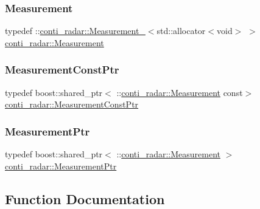 \mbox{\label{namespaceconti__radar_a89a4c51c8eaeb98be9a074f53e585df1}} 
\subsubsection{\texorpdfstring{Measurement}{Measurement}}
{\footnotesize\ttfamily typedef \+::\hyperlink{structconti__radar_1_1Measurement__}{conti\+\_\+radar\+::\+Measurement\+\_\+}$<$std\+::allocator$<$void$>$ $>$ \hyperlink{namespaceconti__radar_a89a4c51c8eaeb98be9a074f53e585df1}{conti\+\_\+radar\+::\+Measurement}}

\mbox{\label{namespaceconti__radar_ae267646599157e26315eb50600c57bff}} 
\subsubsection{\texorpdfstring{Measurement\+Const\+Ptr}{MeasurementConstPtr}}
{\footnotesize\ttfamily typedef boost\+::shared\+\_\+ptr$<$ \+::\hyperlink{namespaceconti__radar_a89a4c51c8eaeb98be9a074f53e585df1}{conti\+\_\+radar\+::\+Measurement} const$>$ \hyperlink{namespaceconti__radar_ae267646599157e26315eb50600c57bff}{conti\+\_\+radar\+::\+Measurement\+Const\+Ptr}}

\mbox{\label{namespaceconti__radar_af28899e00f1d9b7cec43a270c8ba25f9}} 
\subsubsection{\texorpdfstring{Measurement\+Ptr}{MeasurementPtr}}
{\footnotesize\ttfamily typedef boost\+::shared\+\_\+ptr$<$ \+::\hyperlink{namespaceconti__radar_a89a4c51c8eaeb98be9a074f53e585df1}{conti\+\_\+radar\+::\+Measurement} $>$ \hyperlink{namespaceconti__radar_af28899e00f1d9b7cec43a270c8ba25f9}{conti\+\_\+radar\+::\+Measurement\+Ptr}}



\subsection{Function Documentation}
\mbox{\label{namespaceconti__radar_ae82ecbb25e59ba5d52a7cf38e85d4780}} 
